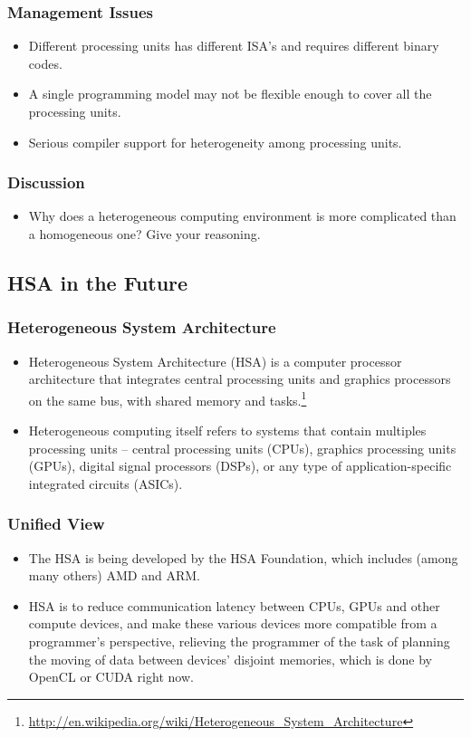 \documentclass{beamer}
\begin{document}
\begin{frame}
  \frametitle{Management Issues}
  \begin{itemize}
  \item Different processing units has different ISA's and requires
    different binary codes.
  \item A single programming model may not be flexible enough to
    cover all the processing units.
  \item Serious compiler support for heterogeneity among processing
    units.
  \end{itemize}
\end{frame}

\begin{frame}
  \frametitle{Discussion}
  \begin{itemize}
  \item Why does a heterogeneous computing environment is more
    complicated than a homogeneous one?  Give your reasoning.
  \end{itemize}
\end{frame}

\subsection{HSA in the Future}

\begin{frame}
  \frametitle{Heterogeneous System Architecture}
  \begin{itemize}
  \item Heterogeneous System Architecture (HSA) is a computer
    processor architecture that integrates central processing units
    and graphics processors on the same bus, with shared memory and
    tasks.\footnote{\url{http://en.wikipedia.org/wiki/Heterogeneous_System_Architecture}}
  \item Heterogeneous computing itself refers to systems that contain
    multiples processing units – central processing units (CPUs),
    graphics processing units (GPUs), digital signal processors
    (DSPs), or any type of application-specific integrated circuits
    (ASICs).
  \end{itemize}
\end{frame}

\begin{frame}
  \frametitle{Unified View}
  \begin{itemize}
  \item The HSA is being developed by the HSA Foundation, which includes
    (among many others) AMD and ARM. 
  \item HSA is to reduce communication latency between CPUs, GPUs and
    other compute devices, and make these various devices more
    compatible from a programmer's perspective, relieving the programmer
    of the task of planning the moving of data between devices' disjoint
    memories, which is done by OpenCL or CUDA right now.
  \end{itemize}
\end{frame}
\end{document}
